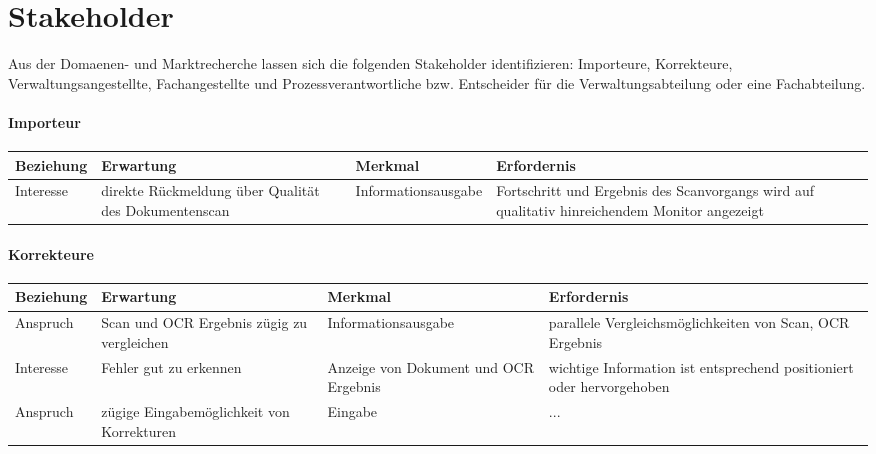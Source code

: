 \documentclass[11pt,oneside,a4paper,notitlepage]{article}
\begin{document}
\section{Stakeholder}

Aus der Domaenen- und Marktrecherche lassen sich die folgenden Stakeholder identifizieren: Importeure, Korrekteure, Verwaltungsangestellte, Fachangestellte und Prozessverantwortliche bzw. Entscheider für die Verwaltungsabteilung oder eine Fachabteilung.\\

%
\paragraph*{Importeur}
\begin{center}
\begin{tabular}{| p{25mm} | p{5cm} | p{35mm} | p{5cm} |}
\hline
Beziehung & Erwartung  & Merkmal & Erfordernis\\
\hline 
Interesse & direkte Rückmeldung über Qualität des Dokumentenscan & Informationsausgabe & Fortschritt und Ergebnis des Scanvorgangs wird auf qualitativ hinreichendem Monitor angezeigt \\
\hline
\end{tabular}
\end{center}
%


\paragraph*{Korrekteure}
\begin{center}
\begin{tabular}{| p{25mm} | p{5cm} | p{35mm} | p{5cm} |}
\hline
Beziehung & Erwartung & Merkmal & Erfordernis\\
\hline
Anspruch & Scan und OCR Ergebnis zügig zu vergleichen & Informationsausgabe & parallele Vergleichsmöglichkeiten von Scan, OCR Ergebnis \\
Interesse & Fehler gut zu erkennen & Anzeige von Dokument und OCR Ergebnis & wichtige Information ist entsprechend positioniert oder hervorgehoben\\ 
Anspruch & zügige Eingabemöglichkeit von Korrekturen & Eingabe   & ... \\
\hline
\end{tabular}
\end{center}
%
%
\end{document}
